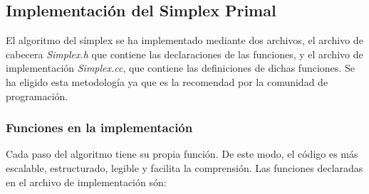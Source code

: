 \documentclass[12pt, titlepage]{article}
\begin{document}
\subsection{Implementación del Simplex Primal}

El algoritmo del símplex se ha implementado mediante dos archivos, el archivo de cabecera \textit{Simplex.h} que contiene las declaraciones de las funciones, y el archivo de implementación \textit{Simplex.cc}, que contiene las definiciones de dichas funciones. Se ha eligido esta metodología ya que es la recomendad por la comunidad de programación.

\subsubsection{Funciones en la implementación}
Cada paso del algoritmo tiene su propia función. De este modo, el código es más escalable, estructurado, legible y facilita la comprensión. Las funciones declaradas en el archivo de implementación són:
\end{document}
